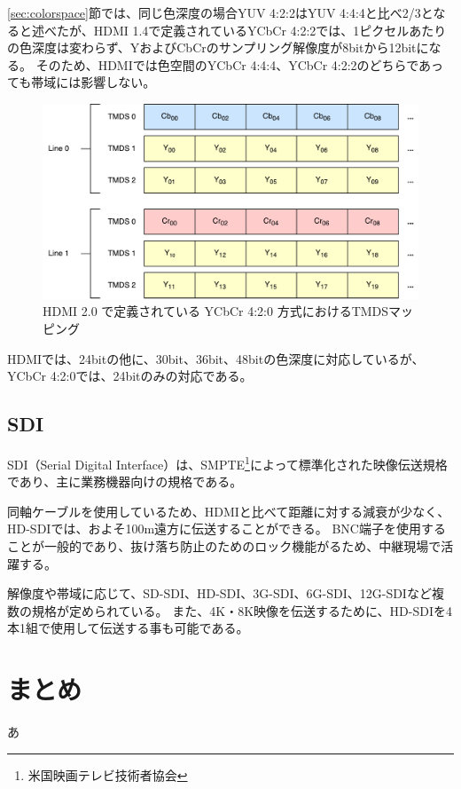 \ref{sec:colorspace}節では、同じ色深度の場合YUV 4:2:2はYUV 4:4:4と比べ2/3となると述べたが、HDMI 1.4で定義されているYCbCr 4:2:2では、1ピクセルあたりの色深度は変わらず、YおよびCbCrのサンプリング解像度が8bitから12bitになる。
そのため、HDMIでは色空間のYCbCr 4:4:4、YCbCr 4:2:2のどちらであっても帯域には影響しない。

\begin{figure}[htbp]
    \begin{center}
        \includegraphics[bb=0 0 591 306,width=15.5cm]{img/hdmi-spec-yuv-420.pdf}
    \end{center}
    \caption{HDMI 2.0 で定義されている YCbCr 4:2:0 方式におけるTMDSマッピング}
    \label{fig:hdmi-spec-yuv-420}
\end{figure}

HDMIでは、24bitの他に、30bit、36bit、48bitの色深度に対応しているが、YCbCr 4:2:0では、24bitのみの対応である。

\subsection{SDI}

SDI（Serial Digital Interface）は、SMPTE\footnote{米国映画テレビ技術者協会}によって標準化された映像伝送規格であり、主に業務機器向けの規格である。

同軸ケーブルを使用しているため、HDMIと比べて距離に対する減衰が少なく、HD-SDIでは、およそ100m遠方に伝送することができる。
BNC端子を使用することが一般的であり、抜け落ち防止のためのロック機能がるため、中継現場で活躍する。

解像度や帯域に応じて、SD-SDI、HD-SDI、3G-SDI、6G-SDI、12G-SDIなど複数の規格が定められている。
また、4K・8K映像を伝送するために、HD-SDIを4本1組で使用して伝送する事も可能である。


\section{まとめ}

あ
